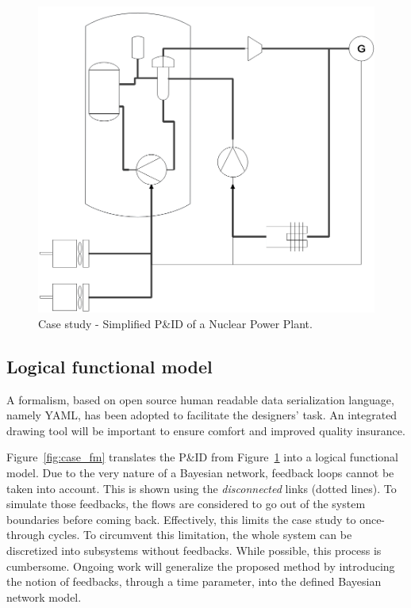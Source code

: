 \begin{figure}[t]
\centering
\includegraphics[scale=.5]{fig/PID}
\caption{Case study - Simplified P\&ID of a Nuclear Power Plant.}
\label{fig:pid}
\end{figure}


\subsection{Logical functional model}

A formalism, based on open source human readable data serialization language, namely YAML, has been adopted to facilitate the designers' task. An integrated drawing tool will be important to ensure comfort and improved quality insurance.

Figure~\ref{fig:case_fm} translates the P\&ID from Figure~\ref{fig:pid} into a logical functional model. Due to the very nature of a Bayesian network, feedback loops cannot be taken into account. This is shown using the \textit{disconnected} links (dotted lines). To simulate those feedbacks, the flows are considered to go out of the system boundaries before coming back. Effectively, this limits the case study to once-through cycles. To circumvent this limitation, the whole system can be discretized into subsystems without feedbacks. While possible, this process is cumbersome. Ongoing work will generalize the proposed method by introducing the notion of feedbacks, through a time parameter, into the defined Bayesian network model.

